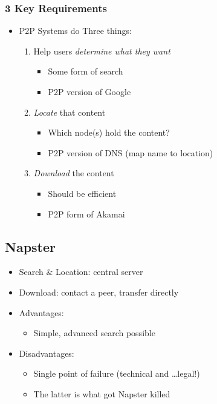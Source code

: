 \subsubsection{3 Key Requirements}
\begin{itemize}[nosep]
    \item P2P Systems do Three things:
          \begin{enumerate}[nosep]
              \item Help users \emph{determine what they want}
                    \begin{itemize}[nosep]
                        \item Some form of search
                        \item P2P version of Google
                    \end{itemize}
              \item \emph{Locate} that content
                    \begin{itemize}[nosep]
                        \item Which node(s) hold the content?
                        \item P2P version of DNS (map name to location)
                    \end{itemize}
              \item \emph{Download} the content
                    \begin{itemize}[nosep]
                        \item Should be efficient
                        \item P2P form of Akamai
                    \end{itemize}
          \end{enumerate}
\end{itemize}
\subsection{Napster}
\begin{itemize}[nosep]
    \item Search \& Location: central server
    \item Download: contact a peer, transfer directly
    \item Advantages:
          \begin{itemize}[nosep]
              \item Simple, advanced search possible
          \end{itemize}
    \item Disadvantages:
          \begin{itemize}[nosep]
              \item Single point of failure (technical and \dots legal!)
              \item The latter is what got Napster killed
          \end{itemize}
\end{itemize}
